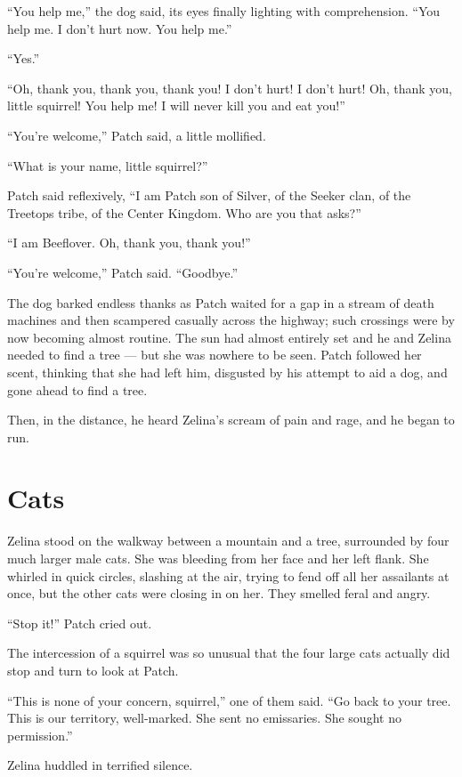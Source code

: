 \documentclass[ebook,oneside,openany,12pt]{memoir}
\begin{document}
“You help me,” the dog said, its eyes finally lighting with
comprehension. “You help me. I don’t hurt now. You help me.”

“Yes.”

“Oh, thank you, thank you, thank you! I don’t hurt! I don’t hurt! Oh,
thank you, little squirrel! You help me! I will never kill you and eat
you!”

“You’re welcome,” Patch said, a little mollified.

“What is your name, little squirrel?”

Patch said reflexively, “I am Patch son of Silver, of the Seeker clan,
of the Treetops tribe, of the Center Kingdom. Who are you that asks?”

“I am Beeflover. Oh, thank you, thank you!”

“You’re welcome,” Patch said. “Goodbye.”

The dog barked endless thanks as Patch waited for a gap in a stream of
death machines and then scampered casually across the highway; such
crossings were by now becoming almost routine. The sun had almost
entirely set and he and Zelina needed to find a tree — but she was
nowhere to be seen. Patch followed her scent, thinking that she had
left him, disgusted by his attempt to aid a dog, and gone ahead to
find a tree.

Then, in the distance, he heard Zelina’s scream of pain and rage, and
he began to run.


\section{Cats}

Zelina stood on the walkway between a mountain and a tree, surrounded
by four much larger male cats. She was bleeding from her face and her
left flank. She whirled in quick circles, slashing at the air, trying
to fend off all her assailants at once, but the other cats were
closing in on her. They smelled feral and angry.

“Stop it!” Patch cried out.

The intercession of a squirrel was so unusual that the four large cats
actually did stop and turn to look at Patch.

“This is none of your concern, squirrel,” one of them said. “Go back
to your tree. This is our territory, well-marked. She sent no
emissaries. She sought no permission.”

Zelina huddled in terrified silence.
\end{document}
